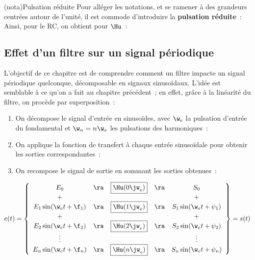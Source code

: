 \documentclass[../../main/main.tex]{subfiles}
\begin{document}
\begin{tcb*}(nota){Pulsation réduite}
	Pour alléger les notations, et se ramener à des grandeurs centrées autour de
	l'unité, il est commode d'introduire la \textbf{pulsation réduite}~:
	\psw{
		\[
			x = \frac{\w}{\w_0}
		\]
	}
	Ainsi, pour le RC, on obtient pour $\Hu$~:
	\psw{
		\[
			\Hu(x) = \frac{1}{1+\jx}
		\]
	}
	\vspace{-15pt}
\end{tcb*}

\subsection{Effet d'un filtre sur un signal périodique}

L'objectif de ce chapitre est de comprendre comment un filtre impacte un signal
périodique quelconque, décomposable en signaux sinusoïdaux. L'idée est semblable
à ce qu'on a fait au chapitre précédent~; en effet, grâce à la linéarité du
filtre, on procède par superposition~:
\begin{enumerate}
	\item On décompose le signal d'entrée en sinusoïdes, avec $\w_e$ la pulsation
	      d'entrée du fondamental et $\w_n = n\w_e$ les pulsations des harmoniques~:
	      \psw{
		      \[
			      e(t) = E_0 + \sum_{n=1}^{+\infty} E_n \sin(\w_n t + \f_n)
		      \]
	      }
	      \vspace{-15pt}
	\item On applique la fonction de transfert à chaque entrée sinusoïdale pour
	      obtenir les sorties correspondantes~:
	      \psw{
		      \[
			      s_n(t) = S_n \sin(\w_n t + \psi_n)
			      \qav
			      S_n = E_n \times \abs{\Hu(\jw_n)}
			      \qet
			      \psi_n = \f_n + \arg(\Hu(\jw_n))
		      \]
	      }
	      \vspace{-15pt}
	\item On recompose le signal de sortie en sommant les sorties obtenues~:
	      \psw{
		      \[
			      s(t) = \sum_{n=0}^{+\infty}s_n(t)
		      \]
	      }
	      \vspace{-15pt}
\end{enumerate}

\[
	e(t) =
	\left\{
	\begin{array}{ccccc}
		E_0                    & \ra & \fbox{$\Hu(0\jw_e)$} & \ra & S_0
		\\
		+                      &     &                      &     & +
		\\
		E_1\sin(\w_e t + \f_1) & \ra & \fbox{$\Hu(1\jw_e)$} & \ra & S_1\sin(\w_e t + \psi_1)
		\\
		+                      &     &                      &     & +
		\\
		E_2\sin(\w_e t + \f_2) & \ra & \fbox{$\Hu(2\jw_e)$} & \ra & S_2\sin(\w_e t + \psi_2)
		\\
		\vdots                 &     &                      &     & \vdots
		\\
		E_n\sin(\w_e t + \f_n) & \ra & \fbox{$\Hu(n\jw_e)$} & \ra & S_n\sin(\w_e t + \psi_n)
	\end{array}
	\right\} = s(t)
\]
\end{document}
